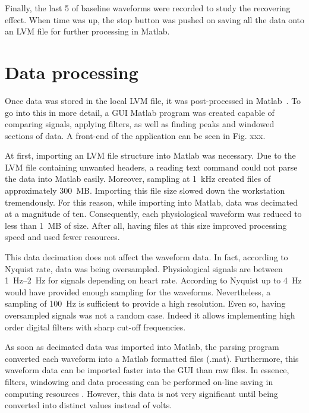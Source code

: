 Finally, the last \SI{5}{\min} of baseline waveforms were recorded to study the recovering effect. When time was up, the stop button was pushed on saving all the data onto an LVM file for further processing in Matlab. 

\section{Data processing}
\label{section procedure 2}

Once data was stored in the local LVM file, it was post-processed in Matlab~\cite{MATLAB:2016}. To go into this in more detail, a GUI Matlab program was created capable of comparing signals, applying filters, as well as finding peaks and windowed sections of data. A front-end of the application can be seen in Fig. xxx.


At first, importing an LVM file structure into Matlab was necessary. Due to the LVM file containing unwanted headers, a reading text command could not parse the data into Matlab easily. Moreover, sampling at \SI{1}{\kilo\hertz} created files of approximately \SI{300}{MB}. Importing this file size slowed down the workstation tremendously. For this reason, while importing into Matlab, data was decimated at a magnitude of ten. Consequently, each physiological waveform was reduced to less than \SI{1}{MB} of size. After all, having files at this size improved processing speed and used fewer resources. 


This data decimation does not affect the waveform data. In fact, according to Nyquist rate, data was being oversampled. Physiological signals are between \SIrange{1}{2}{\hertz} for signals depending on heart rate. According to Nyquist up to \SI{4}{\hertz} would have provided enough sampling for the waveforms. Nevertheless, a sampling of \SI{100}{\hertz} is sufficient to provide a high resolution. Even so, having oversampled signals was not a random case. Indeed it allows implementing high order digital filters with sharp cut-off frequencies. 


As soon as decimated data was imported into Matlab, the parsing program converted each waveform into a Matlab formatted files (.mat). Furthermore, this waveform data can be imported faster into the GUI than raw files. In essence, filters, windowing and data processing can be performed on-line saving in computing resources . However, this data is not very significant until being converted into distinct values instead of volts.

